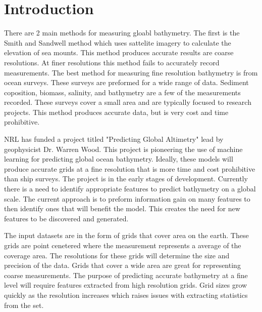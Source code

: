 \section{Introduction}
There are 2 main methods for measuring gloabl bathymetry.
The first is the Smith and Sandwell method which uses sattelite imagery to calculate the elevation of sea mounts.
This method produces accurate results are coarse resolutions.
At finer resolutions this method fails to accurately record measurements.
The best method for measuring fine resolution bathymetry is from ocean surveys.
These surveys are preformed for a wide range of data.
Sediment coposition, biomass, salinity, and bathymetry are a few of the measurements recorded.
These surveys cover a small area and are typically focused to research projects. 
This method produces accurate data, but is very cost and time prohibitive. 


\par
NRL has funded a project titled "Predicting Global Altimetry" lead by geophysicist Dr. Warren Wood.
This project is pioneering the use of machine learning for predicting global ocean bathymetry.
Ideally, these models will produce accurate grids at a fine resolution that is more time and cost prohibitive than ship surveys.
The project is in the early stages of development. 
Currently there is a need to identify appropriate features to predict bathymetry on a global scale. 
The current approach is to preform information gain on many features to then identify ones that will benefit the model.
This creates the need for new features to be discovered and generated. 

\par
The input datasets are in the form of grids that cover area on the earth. 
These grids are point cenetered where the measurement represents a average of the coverage area.
The resolutions for these grids will determine the size and precision of the data.
Grids that cover a wide area are great for representing coarse measurements.
The purpose of predicting accurate bathymetry at a fine level will require features extracted from high resolution grids.
Grid sizes grow quickly as the resolution increases which raises issues with extracting statistics from the set.
